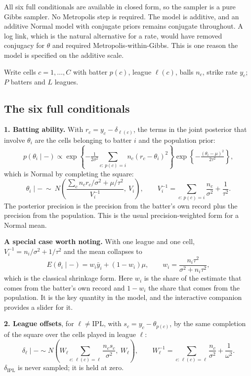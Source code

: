 \documentclass[11pt,a4paper]{article}
\begin{document}
All six full conditionals are available in closed form, so the sampler is a pure Gibbs
sampler. No Metropolis step is required. The model is additive, and an additive
Normal model with conjugate priors remains conjugate throughout. A log link, which is the
natural alternative for a rate, would have removed conjugacy for $\theta$ and required
Metropolis-within-Gibbs. This is one reason the model is specified on the additive scale.

Write cells $c = 1,\dots,C$ with batter $p(c)$, league $\ell(c)$, balls $n_c$, strike rate
$y_c$; $P$ batters and $L$ leagues.

\subsection{The six full conditionals}

\textbf{1. Batting ability.} With $r_c = y_c - \delta_{\ell(c)}$, the terms in the joint
posterior that involve $\theta_i$ are the cells belonging to batter $i$ and the population
prior:
\[
p(\theta_i \mid -) \propto
\exp\!\left\{-\tfrac{1}{2\sigma^2}\!\!\sum_{c:\,p(c)=i}\!\! n_c(r_c-\theta_i)^2\right\}
\exp\!\left\{-\tfrac{(\theta_i-\mu)^2}{2\tau^2}\right\},
\]
which is Normal by completing the square:
\[
\theta_i \mid - \ \sim\ N\!\left(\frac{\sum_c n_c r_c/\sigma^2 + \mu/\tau^2}{V_i^{-1}},\ V_i\right),
\qquad V_i^{-1} = \sum_{c:\,p(c)=i}\frac{n_c}{\sigma^2} + \frac{1}{\tau^2}.
\]
The posterior precision is the precision from the batter's own record plus the precision from
the population. This is the usual precision-weighted form for a Normal mean.

\textbf{A special case worth noting.} With one league and one cell, $V_i^{-1} =
n_i/\sigma^2 + 1/\tau^2$ and the mean collapses to
\[
E(\theta_i \mid -) = w_i \bar{y}_i + (1-w_i)\mu,
\qquad w_i = \frac{n_i \tau^2}{\sigma^2 + n_i \tau^2},
\]
which is the classical shrinkage form. Here $w_i$ is the share of the estimate that comes from
the batter's own record and $1-w_i$ the share that comes from the population. It is the key
quantity in the model, and the interactive companion provides a slider for it.

\textbf{2. League offsets}, for $\ell \neq \text{IPL}$, with $s_c = y_c - \theta_{p(c)}$, by the
same completion of the square over the cells played in league $\ell$:
\[
\delta_\ell \mid - \sim N\!\left(W_\ell \sum_{c:\,\ell(c)=\ell}\frac{n_c s_c}{\sigma^2},\ W_\ell\right),
\qquad W_\ell^{-1} = \sum_{c:\,\ell(c)=\ell}\frac{n_c}{\sigma^2} + \frac{1}{\omega^2}.
\]
$\delta_{\text{IPL}}$ is never sampled; it is held at zero.
\end{document}
